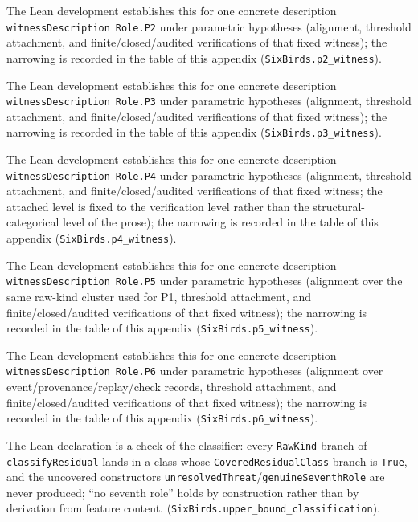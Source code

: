 \documentclass[11pt]{article}
\theoremstyle{definition}
\begin{document}
\begin{description}[style=unboxed,leftmargin=0pt,itemsep=3pt]
  \item[Proposition~\ref{prop:p2-witness}.] The Lean development establishes this for one concrete description \texttt{witnessDescription}\allowbreak\ \texttt{Role.P2} under parametric hypotheses (alignment, threshold attachment, and finite/\allowbreak closed/\allowbreak audited verifications of that fixed witness); the narrowing is recorded in the table of this appendix (\texttt{SixBirds.p2\_witness}).
  \item[Proposition~\ref{prop:p3-witness}.] The Lean development establishes this for one concrete description \texttt{witnessDescription}\allowbreak\ \texttt{Role.P3} under parametric hypotheses (alignment, threshold attachment, and finite/\allowbreak closed/\allowbreak audited verifications of that fixed witness); the narrowing is recorded in the table of this appendix (\texttt{SixBirds.p3\_witness}).
  \item[Proposition~\ref{prop:p4-witness}.] The Lean development establishes this for one concrete description \texttt{witnessDescription}\allowbreak\ \texttt{Role.P4} under parametric hypotheses (alignment, threshold attachment, and finite/\allowbreak closed/\allowbreak audited verifications of that fixed witness; the attached level is fixed to the verification level rather than the structural-categorical level of the prose); the narrowing is recorded in the table of this appendix (\texttt{SixBirds.p4\_witness}).
  \item[Proposition~\ref{prop:p5-witness}.] The Lean development establishes this for one concrete description \texttt{witnessDescription}\allowbreak\ \texttt{Role.P5} under parametric hypotheses (alignment over the same raw-kind cluster used for P1, threshold attachment, and finite/\allowbreak closed/\allowbreak audited verifications of that fixed witness); the narrowing is recorded in the table of this appendix (\texttt{SixBirds.p5\_witness}).
  \item[Proposition~\ref{prop:p6-witness}.] The Lean development establishes this for one concrete description \texttt{witnessDescription}\allowbreak\ \texttt{Role.P6} under parametric hypotheses (alignment over event/\allowbreak provenance/\allowbreak replay/\allowbreak check records, threshold attachment, and finite/\allowbreak closed/\allowbreak audited verifications of that fixed witness); the narrowing is recorded in the table of this appendix (\texttt{SixBirds.p6\_witness}).
  \item[Theorem~\ref{thm:upper-bound-classification}.] The Lean declaration is a check of the classifier: every \texttt{RawKind} branch of \texttt{classifyResidual} lands in a class whose \texttt{CoveredResidualClass} branch is \texttt{True}, and the uncovered constructors \texttt{unresolvedThreat}/\allowbreak\texttt{genuineSeventhRole} are never produced; ``no seventh role'' holds by construction rather than by derivation from feature content. (\texttt{SixBirds.upper\_bound\_classification}).

\end{description}
\end{document}
